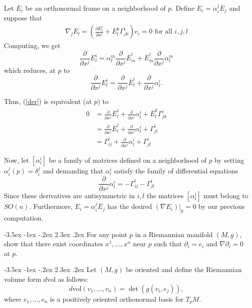 \documentclass[10pt]{article}
\makeatletter
\renewcommand\section{\@startsection{section}{1}{\z@}%
                                  {-3.5ex \@plus -1ex \@minus -.2ex}%
                                  {2.3ex \@plus.2ex}%
                                  {\normalfont\large\bfseries}}
\newcommand{\del}{{\ensuremath{\partial}} }
\newcommand{\xt}[2]{\ensuremath{\Gamma^{#1}_{#2}}}
\makeatother
\begin{document}
Let $\overline{E}_i$ be an orthonormal frame on a neighborhood of $p$.  Define  $E_i = \alpha_i^j \overline{E}_j$ and suppose that
\begin{align}\label{der}\nabla_j E_l = \left( \frac{\del E_l^i}{\del x^j } + E_l^k \xt{i}{jk} \right) e_i  = 0 \mbox{ for all }i,j,l\end{align}
Computing, we get
\[\frac{\del}{\del x^j} E_l^i = \alpha_l^m \frac{\del}{\del x^j} \overline{E}^i_m + \overline{E}^i_m \frac{\del}{\del x^j} \alpha^m_l\]
which reduces, at $p$ to
\[\frac{\del}{\del x^j} E_l^i =  \frac{\del}{\del x^j} \overline{E}^i_l +   \frac{\del}{\del x^j} \alpha^i_l.\]

Thus, (\ref{der}) is equivalent (at $p$) to 
\begin{align*} 0 &=  \frac{\del}{\del x^j} \overline{E}^i_l +   \frac{\del}{\del x^j} \alpha^i_l+ \overline{E}^k_l \xt{i}{jk} \\ &=   \frac{\del}{\del x^j} \overline{E}^i_l +   \frac{\del}{\del x^j} \alpha^i_l+ \xt{i}{jl} \\ &=  \xt{l}{ij} +   \frac{\del}{\del x^j} \alpha^i_l+ \xt{i}{jl} \end{align*}

Now, let $[\alpha_l^i]$ be a family of matrices defined on a neighborhood of $p$ by setting $\alpha_i^j(p) = \delta_i^j$ and demanding that $\alpha_l^i$ satisfy the family of differential equations 
\[ \frac{\del}{\del x^j} \alpha^i_l= - \xt{l}{ij} - \xt{i}{jl} \]
Since these derivatives are antisymmetric in $i,l$ the matrices $[\alpha_l^i]$ must belong to $SO(n)$. Furthermore,  $E_i = \alpha_i^j \overline{E}_j$ has the desired $(\nabla E_i)|_p = 0 $ by our previous computation.


\section{For any point $p$ in a  Riemannian manifold $(M,g)$, show that there exist coordinates $x^1, \dots, x^n$ near $p$ such that $ \del_i = e_i$ and $\nabla \del_i = 0 $ at $p$.}

\section{Let $(M,g)$ be oriented and define the Riemannian volume form $d$vol as follows: $$d\mbox{vol} ( v_1, \dots, v_n) = \det(g (v_i , e_j)),$$ where $e_1, \dots, e_n$ is a positively oriented orthonormal basis for $T_p M$.}
\addtocounter{subsection}{4}
\end{document}
